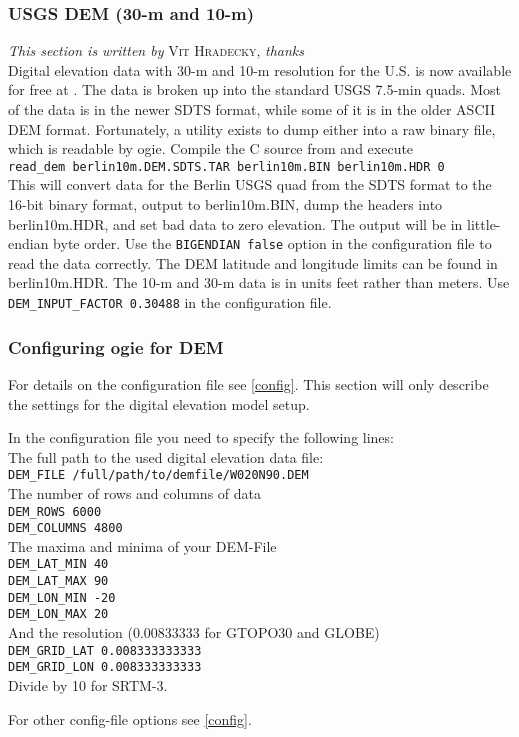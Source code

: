 \subsubsection{USGS DEM (30-m and 10-m)}
\emph{This section is written by} \textsc{Vit Hradecky,} \emph{thanks} \\

Digital elevation data with 30-m and 10-m resolution for the U.S. is
now available for free at \cite{geocomm}.
The data is broken up into the standard USGS 7.5-min quads. Most of the
data is in the newer SDTS format, while some of it is in the older ASCII
DEM format. Fortunately, a utility exists to dump either into a raw
binary file, which is readable by ogie. Compile the C source from
\cite{readdem} and execute \\
\texttt{read\_dem berlin10m.DEM.SDTS.TAR berlin10m.BIN berlin10m.HDR 0} \\
This will convert data for the Berlin USGS quad from the SDTS format to
the 16-bit binary format, output to berlin10m.BIN, dump the headers into
berlin10m.HDR, and set bad data to zero elevation. The output will be in
little-endian byte order. Use the \texttt{BIGENDIAN false} option in the
configuration file to read the data correctly. The DEM latitude and
longitude limits can be found in berlin10m.HDR.
The 10-m and 30-m data is in units feet rather than meters. Use \texttt{DEM\_INPUT\_FACTOR
0.30488} in the configuration file.


\subsubsection{Configuring ogie for DEM}
\label{demconf}

For details on the configuration file see \ref{config}.
This section will only describe the settings for the digital elevation model setup.

In the configuration file you need to specify the following lines: \\
The full path to the used digital elevation data file: \\
\texttt{DEM\_FILE  /full/path/to/demfile/W020N90.DEM} \\

The number of rows and columns of data \\
\texttt{DEM\_ROWS 6000} \\
\texttt{DEM\_COLUMNS 4800} \\

The maxima and minima of your DEM-File \\
\texttt{DEM\_LAT\_MIN 40} \\
\texttt{DEM\_LAT\_MAX 90}\\
\texttt{DEM\_LON\_MIN -20}\\
\texttt{DEM\_LON\_MAX 20}\\

And the resolution (0.00833333 for GTOPO30 and GLOBE)\\
\texttt{DEM\_GRID\_LAT 0.008333333333}\\
\texttt{DEM\_GRID\_LON 0.008333333333}\\
Divide by 10 for SRTM-3.

For other config-file options see \ref{config}.
